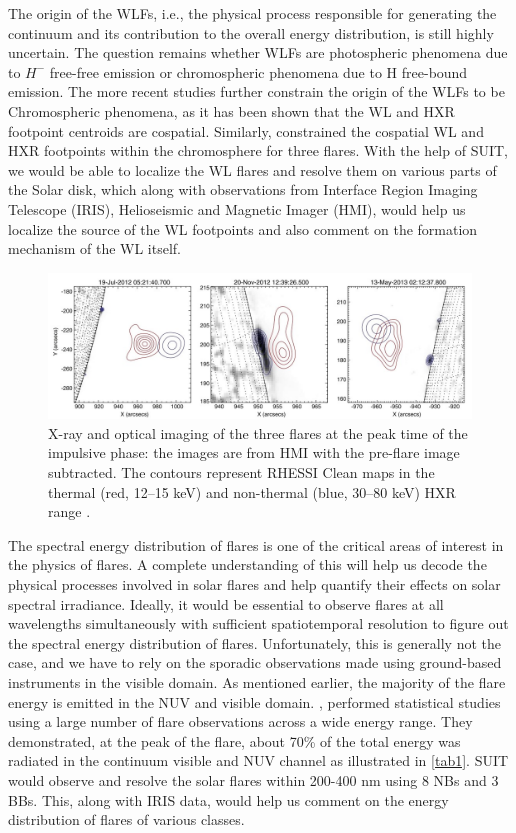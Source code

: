 {The origin of the WLFs, i.e., the physical process responsible for generating the continuum and its contribution to the overall energy distribution, is still highly uncertain. The question remains whether WLFs are photospheric phenomena due to $H^{-}$ free-free emission or chromospheric phenomena due to H free-bound emission. The more recent studies further constrain the origin of the WLFs to be Chromospheric phenomena, as it has been shown that the WL and HXR footpoint centroids are cospatial. Similarly, \cite{krucker15} constrained the cospatial WL and HXR footpoints within the chromosphere for three flares. With the help of SUIT, we would be able to localize the WL flares and resolve them on various parts of the Solar disk, which along with observations from Interface Region Imaging Telescope (IRIS), Helioseismic and Magnetic Imager (HMI), would help us localize the source of the WL footpoints and also comment on the formation mechanism of the WL itself.

\begin{figure}
    \centering
    \includegraphics[width = \linewidth]{Figures/Krucker_2015_ApJ_802_19_page-0004.jpg}
    \caption{X-ray and optical imaging of the three flares at the peak time of the impulsive phase: the images are from HMI with the pre-flare image subtracted. The contours represent RHESSI Clean maps in the thermal (red, 12–15 keV) and non-thermal (blue, 30–80 keV) HXR range \citep{krucker15}.}
    \label{fig1}
\end{figure}

The spectral energy distribution of flares is one of the critical areas of interest in the physics of flares. A complete understanding of this will help us decode the physical processes involved in solar flares and help quantify their effects on solar spectral irradiance. Ideally, it would be essential to observe flares at all wavelengths simultaneously with sufficient spatiotemporal resolution to figure out the spectral energy distribution of flares. Unfortunately, this is generally not the case, and we have to rely on the sporadic observations made using ground-based instruments in the visible domain. As mentioned earlier, the majority of the flare energy is emitted in the NUV and visible domain. \cite{kretzschmar10,kretzschmar11}, performed statistical studies using a large number of flare observations across a wide energy range. They demonstrated, at the peak of the flare, about 70\% of the total energy was radiated in the continuum visible and NUV channel as illustrated in \ref{tab1}. SUIT would observe and resolve the solar flares within 200-400 nm using 8 NBs and 3 BBs. This, along with IRIS data, would help us comment on the energy distribution of flares of various classes.

}

